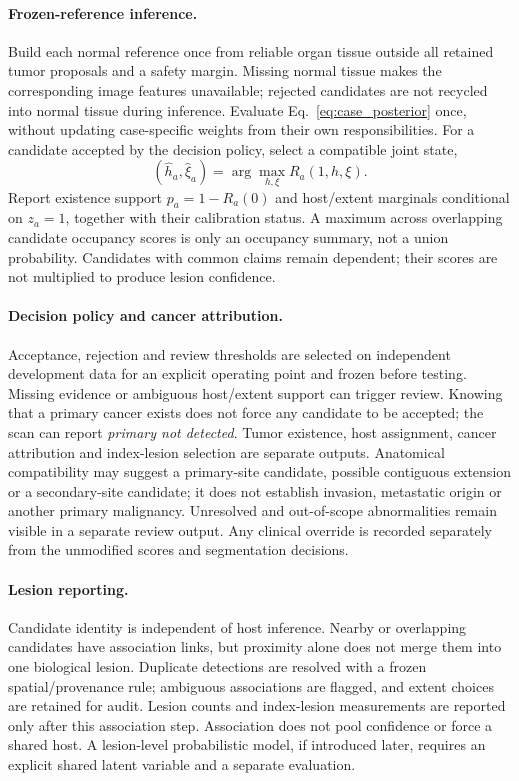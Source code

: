 \documentclass[fleqn,10pt]{olplainarticle}
\begin{document}
\paragraph{Frozen-reference inference.}
Build each normal reference once from reliable organ tissue outside all retained tumor proposals and a safety margin.
Missing normal tissue makes the corresponding image features unavailable; rejected candidates are not recycled into normal
tissue during inference. Evaluate Eq.~\eqref{eq:case_posterior} once, without updating case-specific weights from their own
responsibilities. For a candidate accepted by the decision policy, select a compatible joint state,
\begin{equation}
(\hat h_a,\hat\xi_a)=\arg\max_{h,\xi}R_a(1,h,\xi).
\end{equation}
Report existence support $p_a=1-R_a(0)$ and host/extent marginals conditional on $z_a=1$, together with their calibration
status. A maximum across overlapping candidate occupancy scores is only an occupancy summary, not a union probability.
Candidates with common claims remain dependent; their scores are not multiplied to produce lesion confidence.

\paragraph{Decision policy and cancer attribution.}
Acceptance, rejection and review thresholds are selected on independent development data for an explicit operating point
and frozen before testing. Missing evidence or ambiguous host/extent support can trigger review. Knowing that a primary
cancer exists does not force any candidate to be accepted; the scan can report \emph{primary not detected}. Tumor existence,
host assignment, cancer attribution and index-lesion selection are separate outputs. Anatomical compatibility may suggest
a primary-site candidate, possible contiguous extension or a secondary-site candidate; it does not establish invasion,
metastatic origin or another primary malignancy. Unresolved and out-of-scope abnormalities remain visible in a separate
review output. Any clinical override is recorded separately from the unmodified scores and segmentation decisions.

\paragraph{Lesion reporting.}
Candidate identity is independent of host inference. Nearby or overlapping candidates have association links, but proximity
alone does not merge them into one biological lesion. Duplicate detections are resolved with a frozen spatial/provenance
rule; ambiguous associations are flagged, and extent choices are retained for audit. Lesion counts and index-lesion
measurements are reported only after this association step. Association does not pool confidence or force a shared host.
A lesion-level probabilistic model, if introduced later, requires an explicit shared latent variable and a separate
evaluation.
\end{document}
